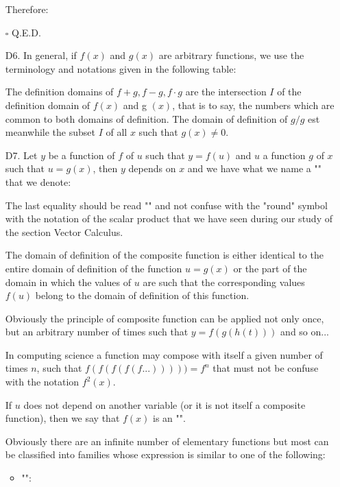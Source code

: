 \begin{enumerate}
\begin{dem}
		Therefore:
		
		\begin{flushright}
			$\square$  Q.E.D.
		\end{flushright}
		\end{dem}
		\item[D6.] In general, if $f (x)$ and $g (x)$ are arbitrary functions, we use the terminology and notations given in the following table:
		
		The definition domains of $f+g,f-g,f\cdot g$ are the intersection $I$ of the definition domain of $f (x)$ and g $(x)$, that is to say, the numbers which are common to both domains of definition. The domain of definition of $g/g$ est meanwhile the subset $I$ of all $x$ such that  $g(x)\neq 0$.
		
		\item[D7.] Let $y$ be a function of $f$ of $u$ such that $y=f(u)$ and $u$ a function $g$ of $x$ such that $u=g(x)$, then $y$ depends on $x$ and we have what we name a "" that we denote:
		
		The last equality should be read "" and not confuse with the "round" symbol with the notation of the scalar product that we have seen during our study of the section Vector Calculus.
		
		The domain of definition of the composite function is either identical to the entire domain of definition of the function $u=g(x)$ or the part of the domain in which the values of $u$ are such that the corresponding values $f (u)$ belong to the domain of definition of this function.
		
		Obviously the principle of composite function can be applied not only once, but an arbitrary number of times such that $y=f(g(h(t)))$ and so on...
		
		In computing science a function may compose with itself a given number of times $n$, such that $f(f(f(f(f...)))))=f^n$ that must not be confuse with the notation $f^2(x)$.
		
		If $u$ does not depend on another variable (or it is not itself a composite function), then we say that $f(x)$ is an "".

		Obviously there are an infinite number of elementary functions but most can be classified into families whose expression is similar to one of the following:
		
		\begin{itemize}
			\item "":
			

\end{itemize}
\end{enumerate}
